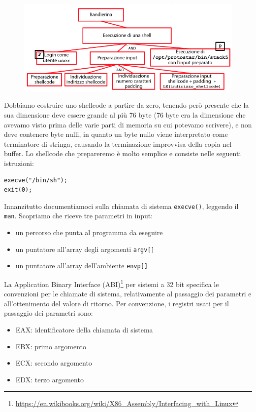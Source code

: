 \begin{figure}[hbpt!]
    \centering
    \includegraphics[width= 0.8 \textwidth]{./Images/cap7/7.21.png}
\end{figure}
\FloatBarrier

Dobbiamo costruire uno shellcode a partire da zero, tenendo però presente che la sua dimensione deve essere grande al più 76 byte (76 byte era la dimensione che avevamo visto prima delle varie parti di memoria su cui potevamo scrivere), e non deve contenere byte nulli, in quanto un byte nullo viene interpretato come terminatore di stringa, causando la terminazione improvvisa della copia nel buffer. Lo shellcode che prepareremo è molto semplice e consiste nelle seguenti istruzioni:
\begin{mdframed}[backgroundcolor=white!20,shadow=false]
\begin{lstlisting}
execve("/bin/sh");
exit(0);
\end{lstlisting}
\end{mdframed}
Innanzitutto documentiamoci sulla chiamata di sistema \texttt{execve()}, leggendo il \texttt{man}. Scopriamo che riceve tre parametri in input:
\begin{itemize}
    \item un percorso che punta al programma da eseguire
    \item un puntatore all'array degli argomenti \texttt{argv[]}
    \item un puntatore all'array dell'ambiente \texttt{envp[]}
\end{itemize}
La Application Binary Interface (ABI)\footnote{\href{https://en.wikibooks.org/wiki/X86\_Assembly/Interfacing\_with\_Linux}{https://en.wikibooks.org/wiki/X86\_Assembly/Interfacing\_with\_Linux}} per sistemi a 32 bit specifica le convenzioni per le chiamate di sistema, relativamente al passaggio dei parametri e all'ottenimento del valore di ritorno. Per convenzione, i registri usati per il passaggio dei parametri sono:
\begin{itemize}
    \item EAX: identificatore della chiamata di sistema
    \item EBX: primo argomento
    \item ECX: secondo argomento
    \item EDX: terzo argomento
\end{itemize}
